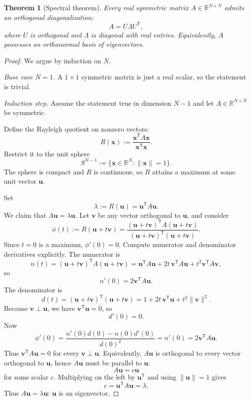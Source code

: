 \documentclass[11pt]{article}
\numberwithin{equation}{section}
\newtheorem{theorem}{Theorem}[section]
\theoremstyle{definition}
\theoremstyle{remark}
\newcommand{\R}{\mathbb{R}}
\newcommand{\trans}{\mathsf{T}}
\newcommand{\norm}[1]{\lVert #1\rVert}
\begin{document}
\begin{theorem}[Spectral theorem]\label{thm:spectral}
Every real symmetric matrix $A\in\R^{N\times N}$ admits an orthogonal diagonalization:
\[
A=U\Lambda U^\trans,
\]
where $U$ is orthogonal and $\Lambda$ is diagonal with real entries. Equivalently, $A$ possesses an orthonormal basis of eigenvectors.
\end{theorem}

\begin{proof}
We argue by induction on $N$.

\emph{Base case $N=1$.} A $1\times 1$ symmetric matrix is just a real scalar, so the statement is trivial.

\emph{Induction step.} Assume the statement true in dimension $N-1$ and let $A\in\R^{N\times N}$ be symmetric.

Define the Rayleigh quotient on nonzero vectors:
\[
R(\mathbf x):=\frac{\mathbf x^\trans A\mathbf x}{\mathbf x^\trans\mathbf x}.
\]
Restrict it to the unit sphere
\[
S^{N-1}:=\{\mathbf x\in\R^N:\norm{\mathbf x}=1\}.
\]
The sphere is compact and $R$ is continuous, so $R$ attains a maximum at some unit vector $\mathbf u$.

Set
\[
\lambda:=R(\mathbf u)=\mathbf u^\trans A\mathbf u.
\]
We claim that $A\mathbf u=\lambda \mathbf u$. Let $\mathbf v$ be any vector orthogonal to $\mathbf u$, and consider
\[
\phi(t):=R(\mathbf u+t\mathbf v)
=
\frac{(\mathbf u+t\mathbf v)^\trans A(\mathbf u+t\mathbf v)}{(\mathbf u+t\mathbf v)^\trans(\mathbf u+t\mathbf v)}.
\]
Since $t=0$ is a maximum, $\phi'(0)=0$. Compute numerator and denominator derivatives explicitly. The numerator is
\[
n(t)=(\mathbf u+t\mathbf v)^\trans A(\mathbf u+t\mathbf v)
=
\mathbf u^\trans A\mathbf u + 2t\,\mathbf v^\trans A\mathbf u + t^2\mathbf v^\trans A\mathbf v,
\]
so
\[
n'(0)=2\mathbf v^\trans A\mathbf u.
\]
The denominator is
\[
d(t)=(\mathbf u+t\mathbf v)^\trans(\mathbf u+t\mathbf v)
=
1+2t\,\mathbf v^\trans\mathbf u+t^2\norm{\mathbf v}^2.
\]
Because $\mathbf v\perp\mathbf u$, we have $\mathbf v^\trans\mathbf u=0$, so
\[
d'(0)=0.
\]
Now
\[
\phi'(0)=\frac{n'(0)d(0)-n(0)d'(0)}{d(0)^2}=n'(0)=2\mathbf v^\trans A\mathbf u.
\]
Thus $\mathbf v^\trans A\mathbf u=0$ for every $\mathbf v\perp\mathbf u$. Equivalently, $A\mathbf u$ is orthogonal to every vector orthogonal to $\mathbf u$, hence $A\mathbf u$ must be parallel to $\mathbf u$:
\[
A\mathbf u=c\mathbf u
\]
for some scalar $c$. Multiplying on the left by $\mathbf u^\trans$ and using $\norm{\mathbf u}=1$ gives
\[
c=\mathbf u^\trans A\mathbf u=\lambda.
\]
Thus $A\mathbf u=\lambda\mathbf u$: $\mathbf u$ is an eigenvector.


\end{proof}
\end{document}
